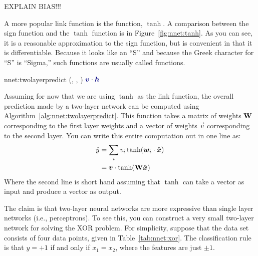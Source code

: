 EXPLAIN BIAS!!!

A more popular link function is the 
function, $\tanh$.  A comparison between the sign function and the
$\tanh$ function is in Figure~\ref{fig:nnet:tanh}.  As you can see, it
is a reasonable approximation to the sign function, but is convenient
in that it is differentiable.  Because it looks like an ``S'' and because the
Greek character for ``S'' is ``Sigma,'' such functions are usually
called  functions.

\newalgorithm%
  {nnet:twolayerpredict}%
  {(, , \VAR{$\hat\vx$})}
  {
\ENDFOR
\RETURN $\dotp{\VARm{\vec v}}{\VARm{\vec h}}$
}


Assuming for now that we are using $\tanh$ as the link function, the
overall prediction made by a two-layer network can be computed using
Algorithm~\ref{alg:nnet:twolayerpredict}.  This function takes a
matrix of weights $\text{\bf W}$ corresponding to the first layer weights
and a vector of weights $\vec v$ corresponding to the second layer.
You can write this entire computation out in one line as:
%
\begin{align}
\hat y
&= \sum_i v_i \tanh( \boldsymbol{w}_i \cdot \hat{{\boldsymbol{x}}} ) \\
&= \boldsymbol{v} \cdot \tanh( \text{\bf W} \hat{{\boldsymbol{x}}} ) \label{eq:nnet:matrixeq}
\end{align}
%
Where the second line is short hand assuming that $\tanh$ can take a
vector as input and produce a vector as output.



The claim is that two-layer neural networks are more expressive than
single layer networks (i.e., perceptrons).  To see this, you can
construct a very small two-layer network for solving the XOR problem.
For simplicity, suppose that the data set consists of four data
points, given in Table~\ref{tab:nnet:xor}.  The classification rule is
that $y=+1$ if and only if $x_1=x_2$, where the features are just $\pm
1$.

